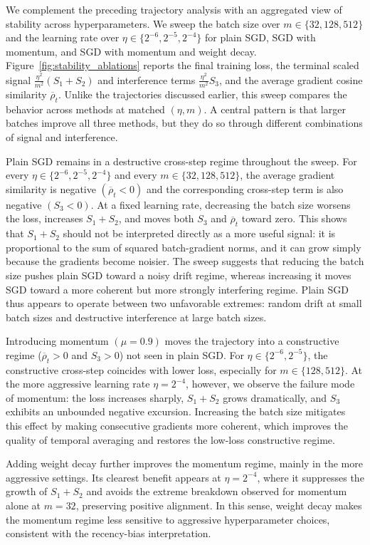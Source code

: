 We complement the preceding trajectory analysis with an aggregated view of stability across hyperparameters. We sweep the batch size over $m\in\{32,128,512\}$ and the learning rate over $\eta\in\{2^{-6},2^{-5},2^{-4}\}$ for plain SGD, SGD with momentum, and SGD with momentum and weight decay. Figure~\ref{fig:stability_ablations} reports the final training loss, the terminal scaled signal $\frac{\eta^2}{m^2}(S_1+S_2)$ and interference terms $\frac{\eta^2}{m^2}S_3$, and the average gradient cosine similarity $\overline{\rho}_t$. Unlike the trajectories discussed earlier, this sweep compares the behavior across methods at matched $(\eta,m)$. A central pattern is that larger batches improve all three methods, but they do so through different combinations of signal and interference.

Plain SGD remains in a destructive cross-step regime throughout the sweep. For every $\eta\in\{2^{-6},2^{-5},2^{-4}\}$ and every $m\in\{32,128,512\}$, the average gradient similarity is negative $(\overline{\rho}_t<0)$ and the corresponding cross-step term is also negative $(S_3<0)$. At a fixed learning rate, decreasing the batch size worsens the loss, increases $S_1+S_2$, and moves both $S_3$ and $\overline{\rho}_t$ toward zero. This shows that $S_1+S_2$ should not be interpreted directly as a more useful signal: it is proportional to the sum of squared batch-gradient norms, and it can grow simply because the gradients become noisier. The sweep suggests that reducing the batch size pushes plain SGD toward a noisy drift regime, whereas increasing it moves SGD toward a more coherent but more strongly interfering regime. Plain SGD thus appears to operate between two unfavorable extremes: random drift at small batch sizes and destructive interference at large batch sizes.

Introducing momentum $(\mu=0.9)$ moves the trajectory into a constructive regime ($\overline{\rho}_t>0$ and $S_3>0$) not seen in plain SGD. For $\eta\in\{2^{-6},2^{-5}\}$, the constructive cross-step coincides with lower loss, especially for $m\in \{128, 512\}$. At the more aggressive learning rate $\eta=2^{-4}$, however, we observe the failure mode of momentum: the loss increases sharply, $S_1+S_2$ grows dramatically, and $S_3$ exhibits an unbounded negative excursion. Increasing the batch size mitigates this effect by making consecutive gradients more coherent, which improves the quality of temporal averaging and restores the low-loss constructive regime. 

Adding weight decay further improves the momentum regime, mainly in the more aggressive settings. Its clearest benefit appears at $\eta=2^{-4}$, where it suppresses the growth of $S_1+S_2$ and avoids the extreme breakdown observed for momentum alone at $m=32$, preserving positive alignment. In this sense, weight decay makes the momentum regime less sensitive to aggressive hyperparameter choices, consistent with the recency-bias interpretation.

